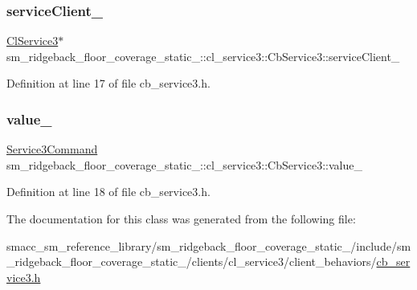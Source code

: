\subsubsection{\texorpdfstring{service\+Client\+\_\+}{serviceClient\_}}
{\footnotesize\ttfamily \hyperlink{classsm__ridgeback__floor__coverage__static__1_1_1cl__service3_1_1ClService3}{Cl\+Service3}$\ast$ sm\+\_\+ridgeback\+\_\+floor\+\_\+coverage\+\_\+static\+\_\+::cl\+\_\+service3\+::\+Cb\+Service3\+::service\+Client\+\_\+\hspace{0.3cm}{\ttfamily [private]}}



Definition at line 17 of file cb\+\_\+service3.\+h.

\mbox{\label{classsm__ridgeback__floor__coverage__static__1_1_1cl__service3_1_1CbService3_a845615b00a06fa3d08fff04282572348}} 
\subsubsection{\texorpdfstring{value\+\_\+}{value\_}}
{\footnotesize\ttfamily \hyperlink{namespacesm__ridgeback__floor__coverage__static__1_1_1cl__service3_aaba74bbc34b595ed42909975cedd5961}{Service3\+Command} sm\+\_\+ridgeback\+\_\+floor\+\_\+coverage\+\_\+static\+\_\+::cl\+\_\+service3\+::\+Cb\+Service3\+::value\+\_\+\hspace{0.3cm}{\ttfamily [private]}}



Definition at line 18 of file cb\+\_\+service3.\+h.



The documentation for this class was generated from the following file\+:\begin{DoxyCompactItemize}
\item 
smacc\+\_\+sm\+\_\+reference\+\_\+library/sm\+\_\+ridgeback\+\_\+floor\+\_\+coverage\+\_\+static\+\_/include/sm\+\_\+ridgeback\+\_\+floor\+\_\+coverage\+\_\+static\+\_/clients/cl\+\_\+service3/client\+\_\+behaviors/\hyperlink{sm__ridgeback__floor__coverage__static__1_2include_2sm__ridgeback__floor__coverage__static__1_2ce833cfdcca1ad0317c30322b608ef46e}{cb\+\_\+service3.\+h}\end{DoxyCompactItemize}
